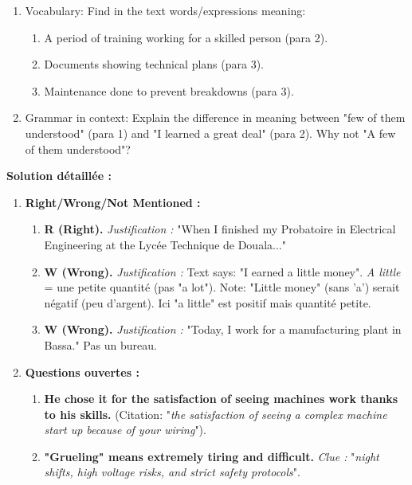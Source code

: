 \documentclass[11pt]{article}
\newcommand{\cle}[1]{{\popxbold\color{popdark}#1}}
\begin{document}
\begin{exoresolu}
\begin{enumerate}
\begin{enumerate}
                  \item What does "grueling" mean in paragraph 2? Find a clue in the text.
              \end{enumerate}
        \item Vocabulary: Find in the text words/expressions meaning:
              \begin{enumerate}
                  \item A period of training working for a skilled person (para 2).
                  \item Documents showing technical plans (para 3).
                  \item Maintenance done to prevent breakdowns (para 3).
              \end{enumerate}
        \item Grammar in context: Explain the difference in meaning between "\cle{few} of them understood" (para 1) and "I learned \cle{a great deal}" (para 2). Why not "A few of them understood"?
    \end{enumerate}
    \tcblower
    \textbf{Solution détaillée :}
    \begin{enumerate}
        \item \textbf{Right/Wrong/Not Mentioned :}
              \begin{enumerate}
                  \item \textbf{R (Right).} \textit{Justification :} "When I finished my Probatoire in Electrical Engineering at the \cle{Lycée Technique de Douala}..."
                  \item \textbf{W (Wrong).} \textit{Justification :} Text says: "I earned \cle{a little} money". \emph{A little} = une petite quantité (pas "a lot"). Note: "Little money" (sans 'a') serait négatif (peu d'argent). Ici "a little" est positif mais quantité petite.
                  \item \textbf{W (Wrong).} \textit{Justification :} "Today, I work for a \cle{manufacturing plant in Bassa}." Pas un bureau.
              \end{enumerate}
        \item \textbf{Questions ouvertes :}
              \begin{enumerate}
                  \item \textbf{He chose it for the satisfaction of seeing machines work thanks to his skills.} (Citation: "\emph{the satisfaction of seeing a complex machine start up because of your wiring}").
                  \item \textbf{"Grueling" means extremely tiring and difficult.} \textit{Clue :} "\emph{night shifts, high voltage risks, and strict safety protocols}".

\end{enumerate}
\end{enumerate}
\end{exoresolu}
\end{document}
